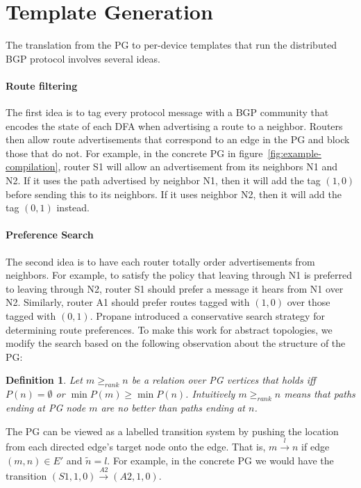 \documentclass[numbers, 10pt, preprint]{sigplanconf}
\newcommand{\para}[1]{\paragraph*{\textbf{#1}}}
\newtheorem{defn}{Definition}[section]
\begin{document}
\section{Template Generation}
\label{sec:generation}

The translation from the PG to per-device templates that run the distributed BGP protocol involves several ideas.

\para{Route filtering}

The first idea is to tag every protocol message with a BGP community that encodes the state of each DFA when advertising a route to a neighbor. Routers then allow route advertisements that correspond to an edge in the PG and block those that do not.
For example, in the concrete PG in figure~\ref{fig:example-compilation}, router S1 will allow an advertisement from its neighbors N1 and N2. If it uses the path advertised by neighbor N1, then it will add the tag $(1,0)$ before sending this to its neighbors. If it uses neighbor N2, then it will add the tag $(0,1)$ instead.


\para{Preference Search}
The second idea is to have each router totally order advertisements from neighbors. For example, to satisfy the policy that leaving through N1 is preferred to leaving through N2, router S1 should prefer a message it hears from N1 over N2. Similarly, router A1 should prefer routes tagged with $(1,0)$ over those tagged with $(0,1)$.
Propane introduced a conservative search strategy for determining route preferences. To make this work for abstract topologies, we modify the search based on the following observation about the structure of the PG:

\begin{defn}
Let $m \geq_{rank} n$ be a relation over PG vertices that holds iff $P(n) = \emptyset$ or $\min P(m) \geq \min P(n)$. Intuitively $m \geq_{rank} n$ means that paths ending at PG node $m$ are no better than paths ending at $n$.
%
\end{defn}
\noindent
%

The PG can be viewed as a labelled transition system by pushing the location from each directed edge's target node onto the edge. That is, $m\overset{l}{\rightarrow}n$ if edge $(m,n) \in E'$ and $\tilde{n} = l$.
%
For example, in the concrete PG we would have the transition $(S1,1,0)\overset{A2}{\rightarrow}(A2,1,0)$.
\end{document}
